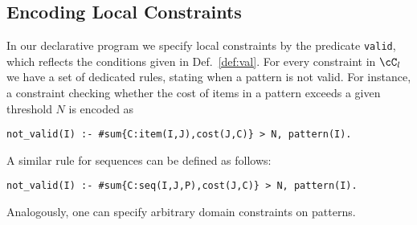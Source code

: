 \subsection{Encoding Local Constraints} 

In our declarative program we specify local constraints by the predicate \texttt{valid}, which reflects the conditions given in Def.~\ref{def:val}. For every constraint in $\cC_l$ we have a set of dedicated rules, stating when a pattern is not valid. 
For instance, a constraint checking whether the cost of items in a pattern exceeds a given threshold $N$ is encoded as %

\small{\begin{center}
\texttt{not\_valid(I) :- \#sum\{C:item(I,J),cost(J,C)\} > N, pattern(I).}
\end{center}}

\normalsize{A similar rule for sequences can be defined as follows: }%

\small{\begin{center}
\texttt{not\_valid(I) :- \#sum\{C:seq(I,J,P),cost(J,C)\} > N, pattern(I).}
\end{center}}

 
\normalsize{Analogously, one can specify arbitrary domain constraints on patterns. }

